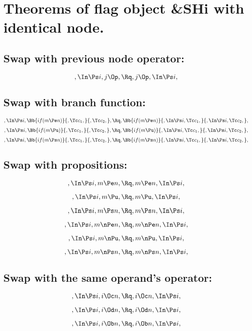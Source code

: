 \bigskip
\bigskip
\bigskip
\bigskip
\section{Theorems of flag object \&SHi with identical node.}
\subsection{Swap with previous node operator:}
\[,\In \Ps i, j \Op, \Rq ,j \Op, \In \Ps i,\]

\bigskip
\bigskip
\subsection{Swap with branch function:}
\[,\In \Ps i, \Bb{if(m \Pe n)}{,\Tc c_1,}{,\Tc c_2,}, \Rq , \Bb{if(m \Pe n)}{,\In \Ps i, \Tc c_1,}{,\In \Ps i, \Tc c_2,},\]
\bigskip
\bigskip
\[,\In \Ps i, \Bb{if(m \Pu)}{,\Tc c_1,}{,\Tc c_2,}, \Rq , \Bb{if(m \Pu)}{,\In \Ps i, \Tc c_1,}{,\In \Ps i, \Tc c_2,},\]
\bigskip
\bigskip
\[,\In \Ps i, \Bb{if(m \Ps n)}{,\Tc c_1,}{,\Tc c_2,}, \Rq , \Bb{if(m \Ps n)}{,\In \Ps i, \Tc c_1,}{,\In \Ps i, \Tc c_2,},\]


\bigskip
\bigskip
\subsection{Swap with propositions:}
\[,\In \Ps i, m \Pe n, \Rq , m \Pe n, \In \Ps i,\]

\[,\In \Ps i, m \Pu, \Rq , m \Pu, \In \Ps i,\]

\[,\In \Ps i, m \Ps n, \Rq , m \Ps n, \In \Ps i,\]

\[,\In \Ps i, m \nPe n, \Rq , m \nPe n, \In \Ps i,\]

\[,\In \Ps i, m \nPu, \Rq , m \nPu, \In \Ps i,\]

\[,\In \Ps i, m \nPs n, \Rq , m \nPs n, \In \Ps i,\]



\bigskip
\bigskip
\subsection{Swap with the same operand's operator:}
\[,\In \Ps i, i \Oc n, \Rq , i \Oc n, \In \Ps i,\]

\[,\In \Ps i, i \Od n, \Rq , i \Od n, \In \Ps i,\]

\[,\In \Ps i, i \Ob n, \Rq , i \Ob n, \In \Ps i,\]


\bigskip
\bigskip
